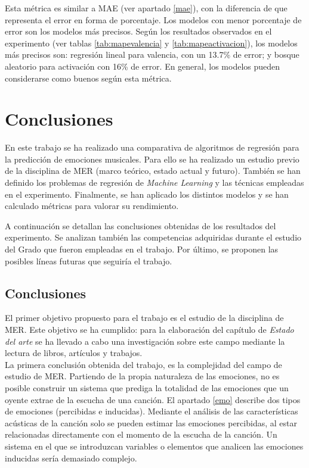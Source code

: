 \documentclass[12pt,a4paper,Spanish]{article}
\begin{document}
Esta métrica es similar a MAE (ver apartado \ref{mae}), con la diferencia de que representa el error en forma de porcentaje. Los modelos con menor porcentaje de error son los modelos más precisos. Según los resultados observados en el experimento (ver tablas \ref{tab:mapevalencia} y \ref{tab:mapeactivacion}), los modelos más precisos son: regresión lineal para valencia, con un 13.7\% de error; y bosque aleatorio para activación con 16\% de error. En general, los modelos pueden considerarse como buenos según esta métrica. 










\newpage
\section{Conclusiones}
En este trabajo se ha realizado una comparativa de algoritmos de regresión para la predicción de emociones musicales. Para ello se ha realizado un estudio previo de la disciplina de MER (marco teórico, estado actual y futuro). También se han definido los problemas de regresión de \textit{Machine Learning} y las técnicas empleadas en el experimento. Finalmente, se han aplicado los distintos modelos y se han calculado métricas para valorar su rendimiento.
\newline

A continuación se detallan las conclusiones obtenidas de los resultados del experimento. Se analizan también las competencias adquiridas durante el estudio del Grado que fueron empleadas en el trabajo. Por último, se proponen las posibles líneas futuras que seguiría el trabajo.

 
\subsection{Conclusiones}
El primer objetivo propuesto para el trabajo es el estudio de la disciplina de MER. Este objetivo se ha cumplido: para la elaboración del capítulo de \textit{Estado del arte} se ha llevado a cabo una investigación sobre este campo mediante la lectura de libros, artículos y trabajos.\\

La primera conclusión obtenida del trabajo, es la complejidad del campo de estudio de MER. Partiendo de la propia naturaleza de las emociones, no es posible construir un sistema que prediga la totalidad de las emociones que un oyente extrae de la escucha de una canción. El apartado \ref{emo} describe dos tipos de emociones (percibidas e inducidas). Mediante el análisis de las características acústicas de la canción solo se pueden estimar las emociones percibidas, al estar relacionadas directamente con el momento de la escucha de la canción. Un sistema en el que se introduzcan variables o elementos que analicen las emociones inducidas sería demasiado complejo.
\newline
\end{document}

